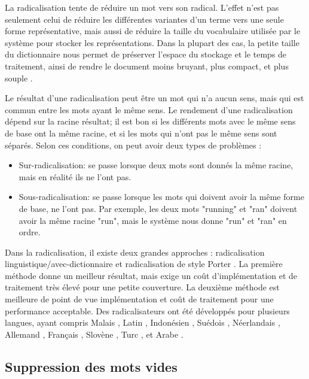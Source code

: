 \documentclass[a4paper,12pt,oneside]{../use/ESIthesis}
\begin{document}
La radicalisation tente de réduire un mot vers son radical. 
L'effet n'est pas seulement celui de réduire les différentes variantes d'un terme vers une seule forme représentative, mais aussi de réduire la taille du vocabulaire utilisée par le système pour stocker les représentations. 
Dans la plupart des cas, la petite taille du dictionnaire nous permet de préserver l'espace du stockage et le temps de traitement, ainsi de rendre le document moins bruyant, plus compact, et plus souple \cite{07-hassel}. 

Le résultat d'une radicalisation peut être un mot qui n'a aucun sens, mais qui est commun entre les mots ayant le même sens. 
Le rendement d'une radicalisation dépend sur la racine résultat; il est bon si les différents mots avec le même sens de base ont la même racine, et si les mots qui n'ont pas le même sens sont séparés. 
Selon ces conditions, on peut avoir deux types de problèmes \cite{07-hassel}:
\begin{itemize}
\item Sur-radicalisation: se passe lorsque deux mots sont donnés la même racine, mais en réalité ils ne l'ont pas. 
\item Sous-radicalisation: se passe lorsque les mots qui doivent avoir la même forme de base, ne l'ont pas. 
Par exemple, les deux mots "running" et "ran" doivent avoir la même racine "run", mais le système nous donne "run" et "ran" en ordre.
\end{itemize}

Dans la radicalisation, il existe deux grandes approches \cite{04-brants}: radicalisation linguistique/avec-dictionnaire et radicalisation de style Porter \cite{97-porter}. 
La première méthode donne un meilleur résultat, mais exige un coût d'implémentation et de traitement très élevé pour une petite couverture. 
La deuxième méthode est meilleure de point de vue implémentation et coût de traitement pour une performance acceptable.
Des radicalisateurs ont été développés pour plusieurs langues, ayant compris Malais \cite{00-tai-al}, Latin \cite{96-greengrass-al}, Indonésien \cite{01-sn-bressan}, Suédois \cite{01-carlberger-al}, Néerlandais \cite{96-kraaij-pohlmann}, Allemand \cite{01-monz-rijke}, Français \cite{01-moulinier-al}, Slovène \cite{92-popovic-willett}, Turc \cite{96-ekmekcioglu-al}, et Arabe \cite{02-larkey-al}.

\subsection{Suppression des mots vides}
\end{document}
